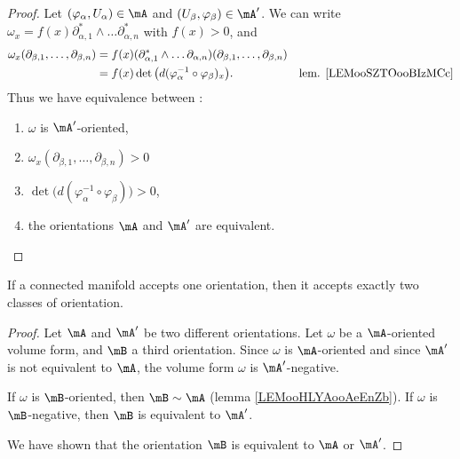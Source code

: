 \begin{proof}
	Let \( (\varphi_{\alpha}, U_{\alpha})\in\mA\) and \( (U_{\beta},\varphi_{\beta})\in\mA'\). We can write \( \omega_x=f(x)\partial^*_{\alpha,1}\wedge\ldots\partial_{\alpha,n}^*\) with \( f(x)>0\), and
	\begin{subequations}
		\begin{align}
			\omega_x(\partial_{\beta,1},\ldots,\partial_{\beta,n}) & =f(x)(\partial^*_{\alpha,1}\wedge\ldots\partial_{\alpha,n})(\partial_{\beta,1},\ldots,\partial_{\beta,n})                                       \\
			                                                       & =f(x)\det\big( d(\varphi_{\alpha}^{-1}\circ \varphi_{\beta})_x \big).                                     & \text{lem. \ref{LEMooSZTOooBIzMCc}}
		\end{align}
	\end{subequations}
	Thus we have equivalence between :
	\begin{enumerate}
		\item
		      \( \omega\) is \( \mA'\)-oriented,
		\item
		      \( \omega_x(\partial_{\beta,1},\ldots,\partial_{\beta,n})>0\)
		\item
		      $\det\big( d(\varphi_{\alpha}^{-1}\circ\varphi_{\beta}) \big)>0$,
		\item
		      the orientations \( \mA\) and \( \mA'\) are equivalent.
	\end{enumerate}
\end{proof}

\begin{proposition}		\label{PROPooNCNJooHFngBW}
	If a connected manifold accepts one orientation, then it accepts exactly two classes of orientation.
\end{proposition}

\begin{proof}
	Let \( \mA\) and \( \mA'\) be two different orientations. Let \( \omega\) be a \( \mA\)-oriented volume form, and \( \mB\) a third orientation. Since \( \omega\) is \( \mA\)-oriented and since \( \mA'\) is not equivalent to \( \mA\), the volume form \( \omega\) is \( \mA'\)-negative.


	If \( \omega\) is \( \mB\)-oriented, then \( \mB\sim\mA\) (lemma \ref{LEMooHLYAooAeEnZb}). If \( \omega\) is \( \mB\)-negative, then \( \mB\) is equivalent to \( \mA'\).

	We have shown that the orientation \( \mB\) is equivalent to \( \mA\) or \( \mA'\).
\end{proof}



